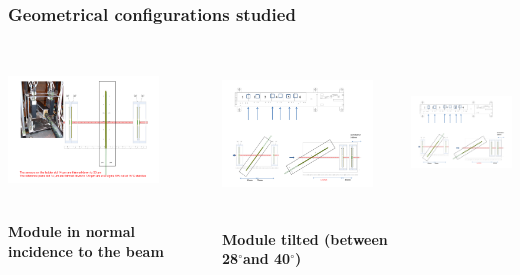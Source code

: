 \documentclass{beamer}
\newcommand{\degres}{\ensuremath{^\circ}}
\begin{document}
  \begin{frame}
    \frametitle{Geometrical configurations studied}

    \vspace{-0.1cm}
    \begin{columns}[t]
      \begin{column}{4cm}
        \begin{center}
          \includegraphics[width = 4cm,height = 3.9cm]{Pictures/tb_cern_11_sketch_normal.pdf}

          \footnotesize{\textbf{Module in normal incidence to the beam}}
        \end{center}
      \end{column}

      \begin{column}{4cm}
        \begin{center}
          \includegraphics[width = 4cm,height = 4.1cm]{Pictures/tb_cern_11_sketch_tilted.pdf}

          \vspace{-0.2cm}
          \footnotesize{\textbf{Module tilted (between 28\degres and 40\degres)}}
        \end{center}
      \end{column}

      \begin{column}{4cm}
        \begin{center}
          \includegraphics[width = 4cm,height = 4.0cm]{Pictures/tb_cern_11_sketch_tilted120mm.pdf}


\end{center}
\end{column}
\end{columns}
\end{frame}
\end{document}
